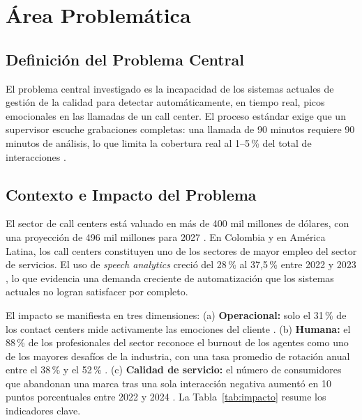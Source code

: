 \section{Área Problemática}

\subsection{Definición del Problema Central}

El problema central investigado es la incapacidad de los sistemas actuales de gestión
de la calidad para detectar automáticamente, en tiempo real, picos emocionales en las
llamadas de un call center. El proceso estándar exige que un supervisor escuche
grabaciones completas: una llamada de 90 minutos requiere 90 minutos de análisis, lo
que limita la cobertura real al 1--5\,\% del total de interacciones \cite{zoom2025}.

\subsection{Contexto e Impacto del Problema}

El sector de call centers está valuado en más de 400 mil millones de dólares, con una
proyección de 496 mil millones para 2027 \cite{zoom2025}. En Colombia y en América
Latina, los call centers constituyen uno de los sectores de mayor empleo del sector
de servicios. El uso de \textit{speech analytics} creció del 28\,\% al 37{,}5\,\%
entre 2022 y 2023 \cite{zoom2025}, lo que evidencia una demanda creciente de
automatización que los sistemas actuales no logran satisfacer por completo.

El impacto se manifiesta en tres dimensiones: (a) \textbf{Operacional:} solo el 31\,\%
de los contact centers mide activamente las emociones del cliente \cite{zoom2025}.
(b) \textbf{Humana:} el 88\,\% de los profesionales del sector reconoce el burnout de
los agentes como uno de los mayores desafíos de la industria, con una tasa promedio de
rotación anual entre el 38\,\% y el 52\,\% \cite{sqm2023, hiringbranch2024}.
(c) \textbf{Calidad de servicio:} el número de consumidores que abandonan una marca
tras una sola interacción negativa aumentó en 10 puntos porcentuales entre 2022 y
2024 \cite{zoom2025}. La Tabla~\ref{tab:impacto} resume los indicadores clave.

